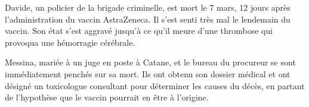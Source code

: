 Davide, un policier de la brigade criminelle, est mort le 7 mars, 12 jours après
l'administration du vaccin AstraZeneca. Il s'est senti très mal le lendemain du
vaccin. Son état s'est aggravé jusqu'à ce qu'il meure d'une thrombose qui
provoqua une hémorragie cérébrale.

Messina, mariée à un juge en poste à Catane, et le bureau du procureur se sont
immédiatement penchés sur sa mort. Ils ont obtenu son dossier médical et ont
désigné un toxicologue consultant pour déterminer les causes du décès, en
partant de l'hypothèse que le vaccin pourrait en être à l'origine.
